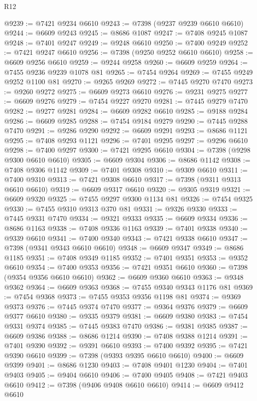 \begin{lexlean}{R12}
\begin{coremodule}
{{{{{{{{{{{{{{{{{{{{{{{{{{{{{{{{{{{{{{{{{{{{{{{{{{{{{{{{{{{{{{{{{{{{{{{{{{{{{{{{{{@9239 := @7421 @9234 @6610
@9243 := @7398 (@9237 @9239 @6610 @6610)
@9244 := @6609 @9243
@9245 := @8686 @1087
@9247 := @7408 @9245 @1087
@9248 := @7401 @9247
@9249 := @9248 @6610
@9250 := @7400 @9249
@9252 := @7421 @9247 @6610
@9256 := @7398 (@9250 @9252 @6610 @6610)
@9258 := @6609 @9256 @6610
@9259 := @9244 @9258
@9260 := @6609 @9259
@9264 := @7455 @9236 @9239 @1078 @81
@9265 := @7454 @9264
@9269 := @7455 @9249 @9252 @1100 @81
@9270 := @9265 @9269
@9272 := @7445 @9270 @7470
@9273 := @9260 @9272
@9275 := @6609 @9273 @6610
@9276 := @9231 @9275
@9277 := @6609 @9276
@9279 := @7454 @9227 @9270
@9281 := @7445 @9279 @7470
@9282 := @9277 @9281
@9284 := @6609 @9282 @6610
@9285 := @9188 @9284
@9286 := @6609 @9285
@9288 := @7454 @9184 @9279
@9290 := @7445 @9288 @7470
@9291 := @9286 @9290
@9292 := @6609 @9291
@9293 := @8686 @1121
@9295 := @7408 @9293 @1121
@9296 := @7401 @9295
@9297 := @9296 @6610
@9298 := @7400 @9297
@9300 := @7421 @9295 @6610
@9304 := @7398 (@9298 @9300 @6610 @6610)
@9305 := @6609 @9304
@9306 := @8686 @1142
@9308 := @7408 @9306 @1142
@9309 := @7401 @9308
@9310 := @9309 @6610
@9311 := @7400 @9310
@9313 := @7421 @9308 @6610
@9317 := @7398 (@9311 @9313 @6610 @6610)
@9319 := @6609 @9317 @6610
@9320 := @9305 @9319
@9321 := @6609 @9320
@9325 := @7455 @9297 @9300 @1134 @81
@9326 := @7454 @9325
@9330 := @7455 @9310 @9313 @370 @81
@9331 := @9326 @9330
@9333 := @7445 @9331 @7470
@9334 := @9321 @9333
@9335 := @6609 @9334
@9336 := @8686 @1163
@9338 := @7408 @9336 @1163
@9339 := @7401 @9338
@9340 := @9339 @6610
@9341 := @7400 @9340
@9343 := @7421 @9338 @6610
@9347 := @7398 (@9341 @9343 @6610 @6610)
@9348 := @6609 @9347
@9349 := @8686 @1185
@9351 := @7408 @9349 @1185
@9352 := @7401 @9351
@9353 := @9352 @6610
@9354 := @7400 @9353
@9356 := @7421 @9351 @6610
@9360 := @7398 (@9354 @9356 @6610 @6610)
@9362 := @6609 @9360 @6610
@9363 := @9348 @9362
@9364 := @6609 @9363
@9368 := @7455 @9340 @9343 @1176 @81
@9369 := @7454 @9368
@9373 := @7455 @9353 @9356 @1198 @81
@9374 := @9369 @9373
@9376 := @7445 @9374 @7470
@9377 := @9364 @9376
@9379 := @6609 @9377 @6610
@9380 := @9335 @9379
@9381 := @6609 @9380
@9383 := @7454 @9331 @9374
@9385 := @7445 @9383 @7470
@9386 := @9381 @9385
@9387 := @6609 @9386
@9388 := @8686 @1214
@9390 := @7408 @9388 @1214
@9391 := @7401 @9390
@9392 := @9391 @6610
@9393 := @7400 @9392
@9395 := @7421 @9390 @6610
@9399 := @7398 (@9393 @9395 @6610 @6610)
@9400 := @6609 @9399
@9401 := @8686 @1230
@9403 := @7408 @9401 @1230
@9404 := @7401 @9403
@9405 := @9404 @6610
@9406 := @7400 @9405
@9408 := @7421 @9403 @6610
@9412 := @7398 (@9406 @9408 @6610 @6610)
@9414 := @6609 @9412 @6610
}}}}}}}}}}}}}}}}}}}}}}}}}}}}}}}}}}}}}}}}}}}}}}}}}}}}}}}}}}}}}}}}}}}}}}}}}}}}}}}}}}
\end{coremodule}
\end{lexlean}
